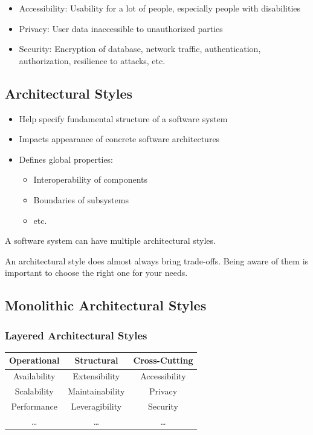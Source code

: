 \documentclass[
../../Software_Engineering_Summary.tex,
]
{subfiles}
\begin{document}
\begin{defbox}
    \begin{itemize}
        \item Accessibility: Usability for a lot of people, especially people with disabilities
        \item Privacy: User data inaccessible to unauthorized parties
        \item Security: Encryption of database, network traffic, authentication, authorization, resilience to attacks, etc.
    \end{itemize}
\end{defbox}

\subsection{Architectural Styles}
\begin{itemize}
    \item Help specify fundamental structure of a software system
    \item Impacts appearance of concrete software architectures
    \item Defines global properties:
    \begin{itemize}
        \item Interoperability of components
        \item Boundaries of subsystems
        \item etc.
    \end{itemize}
\end{itemize}
A software system can have multiple architectural styles.

An architectural style does almost always bring trade-offs. Being aware of them is important to choose the right one for your needs.

\subsection{Monolithic Architectural Styles}
\subsubsection{Layered Architectural Styles}
    \begin{center}
        \begin{tabular}{|c|c|c|}
            \hline
            \rowcolor{codered!40}\textbf{Operational} & \textbf{Structural} & \textbf{Cross-Cutting}\\
            \hline
            Availability & Extensibility & Accessibility\\
            Scalability & Maintainability & Privacy\\
            Performance & Leveragibility & Security\\
            \dots & \dots & \dots\\
            \hline
        \end{tabular}
    \end{center}
\end{document}
